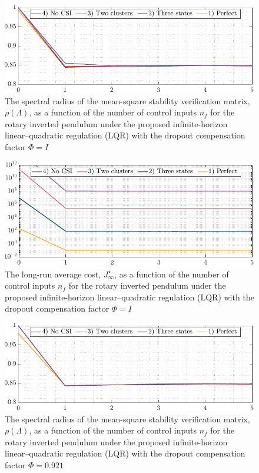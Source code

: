 \begin{bibunit}[alpha]
{\begin{figure}[h!]
\begin{center}
\includegraphics[width=0.7\columnwidth]{stability-cntrl-1.pdf}
\caption{The spectral radius of the mean-square stability verification matrix, $\rho(\mathit{\Lambda})$, as a function of the number of control inputs $n_f$ for the rotary inverted pendulum under the proposed infinite-horizon linear–quadratic regulation (LQR) with the dropout compensation factor $\mathit{\Phi}=I$}
\end{center}
\end{figure}
\begin{figure}[h!]
\begin{center}
\includegraphics[width=0.7\columnwidth]{cost-cntrl-1.pdf}
\caption{The long-run average cost, $J_{\infty}^{\star}$, as a function of the number of control inputs $n_f$ for the rotary inverted pendulum under the proposed infinite-horizon linear–quadratic regulation (LQR) with the dropout compensation factor $\mathit{\Phi}=I$}
\end{center}
\end{figure}
\begin{figure}[h!]
\begin{center}
\includegraphics[width=0.76\columnwidth]{stability-cntrl-9.pdf}
\caption{The spectral radius of the mean-square stability verification matrix, $\rho(\mathit{\Lambda})$, as a function of the number of control inputs $n_f$ for the rotary inverted pendulum under the proposed infinite-horizon linear–quadratic regulation (LQR) with the dropout compensation factor $\mathit{\Phi}=0.921$}

\end{center}
\end{figure}}
\end{bibunit}
